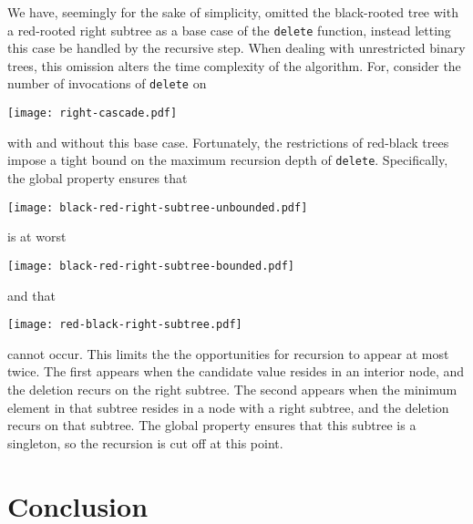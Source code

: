 \documentclass[preprint]{sigplanconf}
\begin{document}
We have, seemingly for the sake of simplicity, omitted the black-rooted tree with a red-rooted right subtree as a base case of the \texttt{delete} function, instead letting this case be handled by the recursive step. When dealing with unrestricted binary trees, this omission alters the time complexity of the algorithm. For, consider the number of invocations of \texttt{delete} on
\begin{center}
\texttt{[image: right-cascade.pdf]}
\end{center}
with and without this base case. Fortunately, the restrictions of red-black trees impose a tight bound on the maximum recursion depth of \texttt{delete}. Specifically, the global property ensures that
\begin{center}
\texttt{[image: black-red-right-subtree-unbounded.pdf]}
\end{center}
is at worst
\begin{center}
\texttt{[image: black-red-right-subtree-bounded.pdf]}
\end{center}
and that
\begin{center}
\texttt{[image: red-black-right-subtree.pdf]}
\end{center}
cannot occur. This limits the the opportunities for recursion to appear at most twice. The first appears when the candidate value resides in an interior node, and the deletion recurs on the right subtree. The second appears when the minimum element in that subtree resides in a node with a right subtree, and the deletion recurs on that subtree. The global property ensures that this subtree is a singleton, so the recursion is cut off at this point.

\section{Conclusion}














\end{document}
